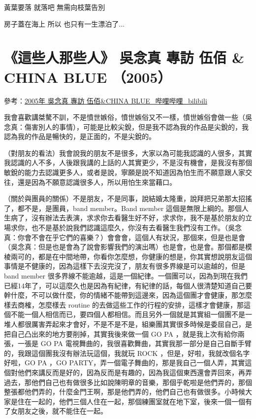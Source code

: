 \documentclass[UTF8,a4paper,oneside,twocolumn,12pt]{ctexbook}
\begin{document}
黃葉要落 就落吧
無需向枝葉告別

房子蓋在海上 所以 也只有一生漂泊了...

\section{《這些人那些人》 吳念真 專訪 伍佰 \& CHINA BLUE （2005）}
參考：\href{https://www.bilibili.com/video/BV1Jx411X79n}{2005年 吳念真 專訪 伍佰\&CHINA BLUE\_哔哩哔哩\_bilibili}

我會喜歡講桀驁不訓，不是憤世嫉俗，憤世嫉俗又不一樣，憤世嫉俗會做一些（吳念真：傷害別人的事情），可能是比較尖銳，但是我不認為我的作品是尖銳的，我認為我的作品是暢快的，是正面的，不是尖銳的。

（對朋友的看法）我會說我的朋友不是很多，大家以為可能我認識的人很多，其實我認識的人不多，人後跟我講的上話的人其實更少，不是沒有機會，是我沒有那個敏銳的能力去認識更多人，或者是說，寧願是說不知道因為怕生而不願意跟人家交往，還是因為不願意認識很多人，所以用怕生來當藉口。

（關於與團員的關係）不是朋友，不是同事，說結婚太隆重，說拜把兄弟那太招搖了，都不是，是團員，band member。Band member 這個是無限上綱的。那個人生病了，沒有辦法去表演，求求你去看醫生好不好，求求你，我不是基於朋友的立場求你，也不是基於說我們認識這麼久，你沒有去看醫生我們沒有工作。（吳念真：你會不會在乎它們的喜樂？）會會會，這個人有狀況，那個來，但是也是會（吳念真：但是也是會為了說會影響我們的演出嗎）也是會，也是會。那個都是模棱兩可的，都是在中間地帶，你看你怎麼想，你健康的想是，你其實想說朋友這個事情是不健康的，因為這樣下去沒完沒了，朋友有很多界線是可以逾越的，但是 band member 很多界線不能逾越，這是一個紀律。一個團可以，因為到現在我們已經14年了，可以這麼久也是因為有紀律，有紀律的話，每個人很清楚知道自己要幹什麼，不可以做什麼，你的情緒不能帶到這邊來，因為這個團才會健康，那怎麼樣去商榷，怎麼樣去 routine 的去做這些工作的行程的安排，這樣才會健康，那這個不能一個人相信而已，要四個人都相信。而且另外一個就是其實組一個團不是一堆人都很厲害弄起來才會好，不是不是不是，組樂團其實很多時候是委屈自己，是把自己凸出來的地方要削掉，其實我後來做一個 GO PA ，就是我上次有給你兩張，一張是 GO PA 電視舞曲的，我很喜歡舞曲，其實我那一部分是自己自斷手臂的，我跟這個團我沒有辦法玩這個，我就玩 ROCK ，但是，好啦，我就改個名字好啦，GO PA ，GO PARTY，弄一個電子舞曲的，那是我自己一個人弄，其實這個對他們來講反而是好的，因為反而是有趣的，因為我這個東西還會弄回來，再弄過去，那他們自己也有做很多比如說陳明章的音樂，那個乎乾啦是他們弄的，那個整張都他們弄的，什麼金門王啊，那是他們弄的，他們自己也有做很多。小時候大家是住在一起的，他們三個人住在一起，那個練團室就在地下室，後來一個一個有了女朋友之後，就不能住在一起。
\end{document}
